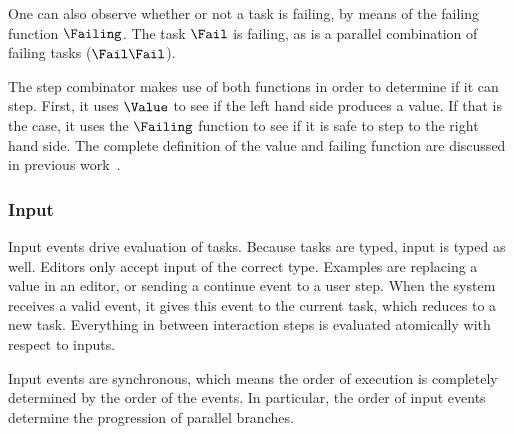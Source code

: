One can also observe whether or not a task is failing, by means of the failing function $\Failing$.
The task $\Fail$ is failing, as is a parallel combination of failing tasks ($\Fail \And \Fail$).

The step combinator makes use of both functions in order to determine if it can step.
First, it uses $\Value$ to see if the left hand side produces a value.
If that is the case, it uses the $\Failing$ function to see if it is safe to step to the right hand side.
The complete definition of the value and failing function are discussed in previous work~\cite{Steenvoorden2019}.


\subsubsection{Input}

Input events drive evaluation of tasks.
Because tasks are typed, input is typed as well.
Editors only accept input of the correct type.
Examples are replacing a value in an editor,
or sending a continue event to a user step.
When the system receives a valid event, it gives this event to the current task, which reduces to a new task.
Everything in between interaction steps is evaluated atomically with respect to inputs.

Input events are synchronous, which means the order of execution is completely determined by the order of the events.
In particular, the order of input events determine the progression of parallel branches.

